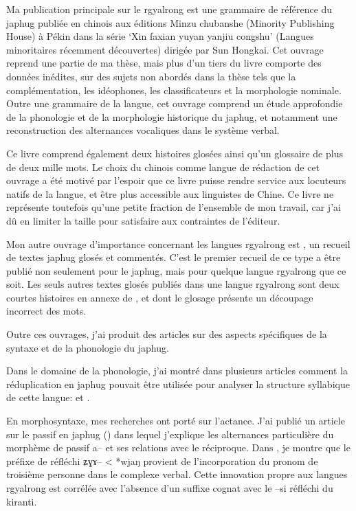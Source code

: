 \documentclass[oldfontcommands,oneside,a4paper,11pt]{memoir}
\newcommand{\ipa}[1]{{\phon #1}} %
\begin{document}
Ma publication principale sur le rgyalrong est \citet{jacques08} une grammaire de référence du japhug publiée en chinois aux éditions Minzu chubanshe (Minority Publishing House) à Pékin dans la série ‘Xin faxian yuyan yanjiu congshu’ (Langues minoritaires récemment découvertes) dirigée par Sun Hongkai. Cet ouvrage reprend une partie de ma thèse, mais plus d’un tiers du livre comporte des données inédites, sur des sujets non abordés dans la thèse tels que la complémentation, les idéophones, les classificateurs et la morphologie nominale. Outre une grammaire de la langue, cet ouvrage comprend un étude approfondie de la phonologie et de la morphologie historique du japhug, et notamment une reconstruction des alternances vocaliques dans le système verbal.


Ce livre comprend également deux histoires glosées ainsi qu’un glossaire de plus de deux mille mots. Le choix du chinois comme langue de rédaction de cet ouvrage a été motivé par l’espoir que ce livre puisse rendre service aux locuteurs natifs de la langue, et être plus accessible aux linguistes de Chine. Ce livre ne représente toutefois qu’une petite fraction de l’ensemble de mon travail, car j’ai dû en limiter la taille pour satisfaire aux contraintes de l’éditeur.

Mon autre ouvrage d'importance concernant les langues rgyalrong est \citet{jacques10gesar}, un recueil de textes japhug glosés et commentés. C'est le premier recueil de ce type a être publié non seulement pour le japhug, mais pour quelque langue rgyalrong que ce soit. Les seuls autres textes glosés publiés dans une langue rgyalrong sont deux courtes histoires en annexe de \citet{linxr93jiarong}, et dont le glosage  présente un découpage incorrect des mots.

Outre ces ouvrages, j’ai produit des articles sur des aspects spécifiques de la syntaxe et de la phonologie du japhug. 

	Dans le domaine de la phonologie, j’ai montré dans plusieurs articles comment la réduplication en japhug pouvait être utilisée pour analyser la structure syllabique de cette langue: \citet{jacques04redupl} et \citet{jacques07redupl}.
	
	
	En morphosyntaxe, mes recherches ont porté sur l’actance. J’ai publié un article sur le passif en japhug (\citealt{jacques07passif}) dans lequel j'explique les alternances particulière du morphème de passif a-- et ses relations avec le réciproque. Dans \citet{jacques10refl}, je montre que le préfixe de réfléchi \ipa{ʑɣɤ}-- < *wjaŋ provient de l'incorporation du pronom de troisième personne dans le complexe verbal. Cette innovation propre aux langues rgyalrong est corrélée avec l'absence d'un suffixe cognat avec le --\ipa{si} réfléchi du kiranti.
	
\end{document}
